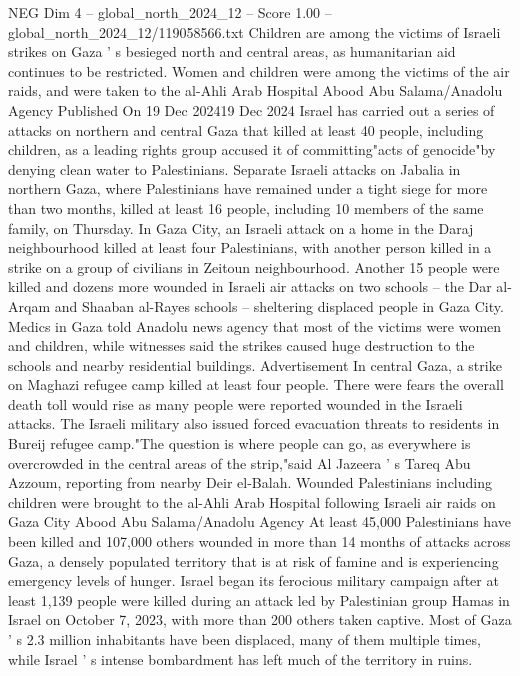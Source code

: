 \begin{textsample}{NEG Dim 4 – global\_north\_2024\_12 – Score 1.00 – global\_north\_2024\_12/119058566.txt}  \label{ex:f4_neg_131}
Children are among the victims of Israeli strikes on Gaza ' s besieged north and central areas, as humanitarian aid continues to be restricted.
Women and children were among the victims of the air raids, and were taken to the al-Ahli Arab Hospital Abood Abu Salama/Anadolu Agency Published On 19 Dec 202419 Dec 2024 Israel has carried out a series of attacks on northern and central Gaza that killed at least 40 people, including children, as a leading rights group accused it of committing"acts of genocide"by denying clean water to Palestinians.
Separate Israeli attacks on Jabalia in northern Gaza, where Palestinians have remained under a tight siege for more than two months, killed at least 16 people, including 10 members of the same family, on Thursday.
In Gaza City, an Israeli attack on a home in the Daraj neighbourhood killed at least four Palestinians, with another person killed in a strike on a group of civilians in Zeitoun neighbourhood.
Another 15 people were killed and dozens more wounded in Israeli air attacks on two schools -- the Dar al-Arqam and Shaaban al-Rayes schools -- sheltering displaced people in Gaza City.
Medics in Gaza told Anadolu news agency that most of the victims were women and children, while witnesses said the strikes caused huge destruction to the schools and nearby residential buildings.
Advertisement In central Gaza, a strike on Maghazi refugee camp killed at least four people.
There were fears the overall death toll would rise as many people were reported wounded in the Israeli attacks.
The Israeli military also issued forced evacuation threats to residents in Bureij refugee camp."The question is where people can go, as everywhere is overcrowded in the central areas of the strip,"said Al Jazeera ' s Tareq Abu Azzoum, reporting from nearby Deir el-Balah.
Wounded Palestinians including children were brought to the al-Ahli Arab Hospital following Israeli air raids on Gaza City Abood Abu Salama/Anadolu Agency At least 45,000 Palestinians have been killed and 107,000 others wounded in more than 14 months of attacks across Gaza, a densely populated territory that is at risk of famine and is experiencing emergency levels of hunger.
Israel began its ferocious military campaign after at least 1,139 people were killed during an attack led by Palestinian group Hamas in Israel on October 7, 2023, with more than 200 others taken captive.
Most of Gaza ' s 2.3 million inhabitants have been displaced, many of them multiple times, while Israel ' s intense bombardment has left much of the territory in ruins.

\end{textsample}
